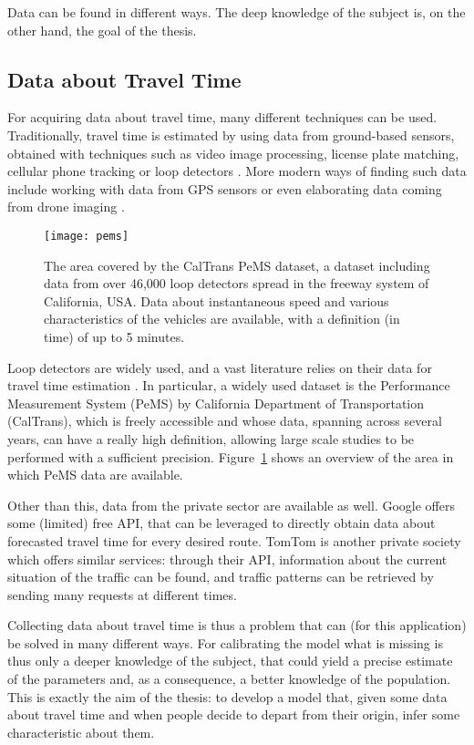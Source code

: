 Data can be found in different ways.
The deep knowledge of the subject is, on the other hand, the goal of the thesis.

\subsection{Data about Travel Time}

For acquiring data about travel time, many different techniques can be used.
Traditionally, travel time is estimated by using data from ground-based sensors,
obtained with techniques such as video image processing, license plate matching, cellular phone tracking or loop detectors \parencite{turner1996advanced,YEON2008325}.
More modern ways of finding such data include working with data from GPS sensors \parencite{mazare2012trade} or even elaborating data coming from drone imaging \parencite{fonod2025songdo}.

\begin{figure}
  \centering
  \texttt{[image: pems]}
  \caption{The area covered by the CalTrans PeMS dataset, a dataset including data from over 46,000 loop detectors spread in the freeway system of California, USA. Data about instantaneous speed and various characteristics of the vehicles are available, with a definition (in time) of up to 5 minutes.}
  \label{fig:pems}
\end{figure}

Loop detectors are widely used, and a vast literature relies on their data for travel time estimation \parencite{YILDIRIMOGLU201345}.
In particular, a widely used dataset is the Performance Measurement System (PeMS) by California Department of Transportation (CalTrans),
which is freely accessible and whose data, spanning across several years,
can have a really high definition,
allowing large scale studies to be performed with a sufficient precision.
Figure~\ref{fig:pems} shows an overview of the area in which PeMS data are available.

Other than this, data from the private sector are available as well.
Google offers some (limited) free API,
that can be leveraged to directly obtain data about forecasted travel time for every desired route.
TomTom is another private society which offers similar services:
through their API, information about the current situation of the traffic can be found,
and traffic patterns can be retrieved by sending many requests at different times.

Collecting data about travel time is thus a problem that can (for this application) be solved in many different ways.
For calibrating the model what is missing is thus only a deeper knowledge of the subject,
that could yield a precise estimate of the parameters and, as a consequence,
a better knowledge of the population.
This is exactly the aim of the thesis:
to develop a model that, given some data about travel time and when people decide to depart from their origin,
infer some characteristic about them.

